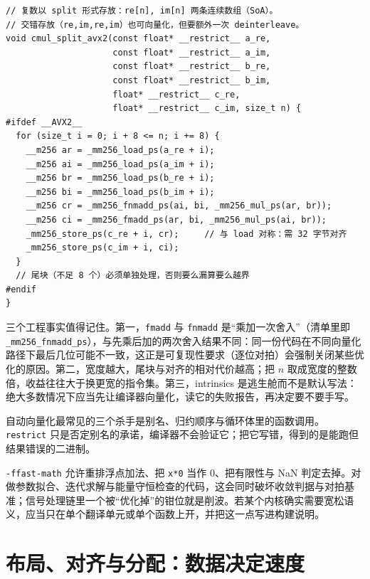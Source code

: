 \documentclass[12pt,a4paper,fontset=fandol]{ctexbook}
\newcommand{\Tp}[1]{\texttt{#1}}
\begin{document}
\begin{lstlisting}[style=cppstyle,caption={AVX2 下的复数乘法：8 个 float 通道装两组复数},label={lst:ch01-avx}]
// 复数以 split 形式存放：re[n], im[n] 两条连续数组（SoA）。
// 交错存放（re,im,re,im）也可向量化，但要额外一次 deinterleave。
void cmul_split_avx2(const float* __restrict__ a_re,
                     const float* __restrict__ a_im,
                     const float* __restrict__ b_re,
                     const float* __restrict__ b_im,
                     float* __restrict__ c_re,
                     float* __restrict__ c_im, size_t n) {
#ifdef __AVX2__
  for (size_t i = 0; i + 8 <= n; i += 8) {
    __m256 ar = _mm256_load_ps(a_re + i);
    __m256 ai = _mm256_load_ps(a_im + i);
    __m256 br = _mm256_load_ps(b_re + i);
    __m256 bi = _mm256_load_ps(b_im + i);
    __m256 cr = _mm256_fnmadd_ps(ai, bi, _mm256_mul_ps(ar, br));
    __m256 ci = _mm256_fmadd_ps(ar, bi, _mm256_mul_ps(ai, br));
    _mm256_store_ps(c_re + i, cr);     // 与 load 对称：需 32 字节对齐
    _mm256_store_ps(c_im + i, ci);
  }
  // 尾块（不足 8 个）必须单独处理，否则要么漏算要么越界
#endif
}
\end{lstlisting}

三个工程事实值得记住。第一，\Tp{fmadd} 与 \Tp{fnmadd} 是``乘加一次舍入''（清单里即 \Tp{\_mm256\_fnmadd\_ps}），与先乘后加的两次舍入结果不同：同一份代码在不同向量化路径下最后几位可能不一致，这正是可复现性要求（逐位对拍）会强制关闭某些优化的原因。第二，宽度越大，尾块与对齐的相对代价越高；把 $n$ 取成宽度的整数倍，收益往往大于换更宽的指令集。第三，intrinsics 是逃生舱而不是默认写法：绝大多数情况下应当先让编译器向量化，读它的失败报告，再决定要不要手写。

自动向量化最常见的三个杀手是别名、归约顺序与循环体里的函数调用。\Tp{restrict} 只是否定别名的承诺，编译器不会验证它；把它写错，得到的是能跑但结果错误的二进制。

\begin{note}[title={宽松浮点开关改变的是语义}]
\Tp{-ffast-math} 允许重排浮点加法、把 \Tp{x*0} 当作 $0$、把有限性与 NaN 判定去掉。对做参数拟合、迭代求解与能量守恒检查的代码，这会同时破坏收敛判据与对拍基准；信号处理链里一个被``优化掉''的钳位就是削波。若某个内核确实需要宽松语义，应当只在单个翻译单元或单个函数上开，并把这一点写进构建说明。
\end{note}

\section{布局、对齐与分配：数据决定速度}
\end{document}
